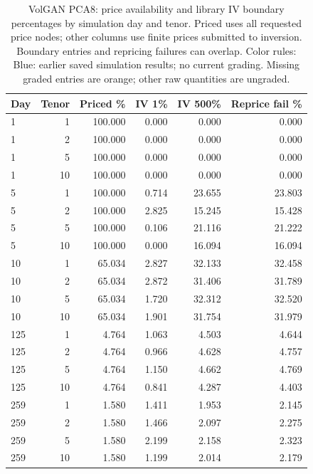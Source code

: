 \documentclass[11pt]{article}
\begin{document}
\begin{table}[H]\centering\small\setlength{\tabcolsep}{4pt}
\caption{VolGAN PCA8: price availability and library IV boundary percentages by simulation day and tenor. Priced uses all requested price nodes; other columns use finite prices submitted to inversion. Boundary entries and repricing failures can overlap. Color rules: Blue: earlier saved simulation results; no current grading. Missing graded entries are orange; other raw quantities are ungraded.}\label{tab:literature-boundary-volgan}
\begin{tabular}{@{}lrrrrr@{}}
\toprule
Day & Tenor & Priced \% & IV 1\% & IV 500\% & Reprice fail \% \\
\midrule
1 & 1 & 100.000 & 0.000 & 0.000 & 0.000 \\
1 & 2 & 100.000 & 0.000 & 0.000 & 0.000 \\
1 & 5 & 100.000 & 0.000 & 0.000 & 0.000 \\
1 & 10 & 100.000 & 0.000 & 0.000 & 0.000 \\
5 & 1 & 100.000 & 0.714 & 23.655 & 23.803 \\
5 & 2 & 100.000 & 2.825 & 15.245 & 15.428 \\
5 & 5 & 100.000 & 0.106 & 21.116 & 21.222 \\
5 & 10 & 100.000 & 0.000 & 16.094 & 16.094 \\
10 & 1 & 65.034 & 2.827 & 32.133 & 32.458 \\
10 & 2 & 65.034 & 2.872 & 31.406 & 31.789 \\
10 & 5 & 65.034 & 1.720 & 32.312 & 32.520 \\
10 & 10 & 65.034 & 1.901 & 31.754 & 31.979 \\
125 & 1 & 4.764 & 1.063 & 4.503 & 4.644 \\
125 & 2 & 4.764 & 0.966 & 4.628 & 4.757 \\
125 & 5 & 4.764 & 1.150 & 4.662 & 4.769 \\
125 & 10 & 4.764 & 0.841 & 4.287 & 4.403 \\
259 & 1 & 1.580 & 1.411 & 1.953 & 2.145 \\
259 & 2 & 1.580 & 1.466 & 2.097 & 2.275 \\
259 & 5 & 1.580 & 2.199 & 2.158 & 2.323 \\
259 & 10 & 1.580 & 1.199 & 2.014 & 2.179 \\
\bottomrule\end{tabular}\end{table}
\end{document}
